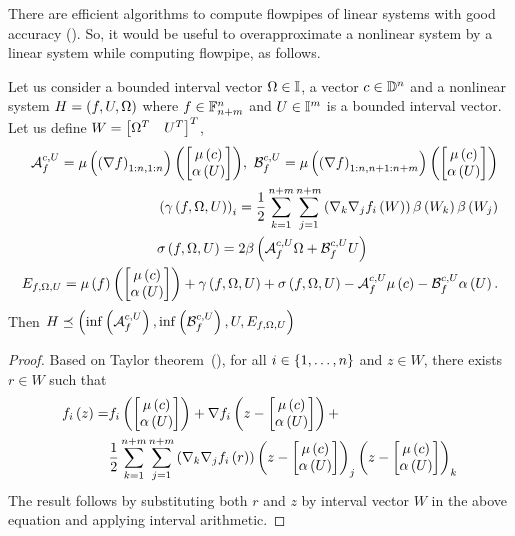 %
There are efficient algorithms to compute flowpipes of linear systems
with good accuracy ().  So, it would be useful to
overapproximate a nonlinear system by a linear system while computing
flowpipe, as follows.
%
\begin{lemma}\label{lem:linearization}
Let us consider a bounded interval vector $\Omega\in\mathbb{I}$, a
vector $c\in\mathbb{D}^n$ and a nonlinear system $H = \left(f,U,\Omega\right)$
where $f\in\mathbb{F}_{n+m}^n$ and $U\in\mathbb{I}^m$ is a bounded interval
vector.  Let us define $W = \begin{bmatrix}\Omega^T & U^T\end{bmatrix}^T$,
\begin{align*}
\begin{split}
\stmat{f}{c}{U} = { \iv{\rb{\nabla{f}}_{1:n,1:n}}{ \mymatrix{ \ivmat{c}\\ \mi{U} } } },
%
~\inpmat{f}{c}{U}
= { \iv{\rb{\nabla{f}}_{1:n,n+1:n+m}}{ \mymatrix{ \ivmat{c}\\ \mi{U}}} }
\end{split}\\
%
\begin{split}
& \rb{\taylor{f}{\Omega}{U}}_i
= \frac{1}{2}\sum_{k=1}^{n+m}\sum_{j=1}^{n+m}\rb{\nabla_k\nabla_j{f_i}\rb{W}}\rad{W_k}\rad{W_j}\\
%
& \sigma\rb{f,\Omega,U} = 2\rad{ \stmat{f}{c}{U}\Omega +
\inpmat{f}{c}{U}U
}
\end{split}\\
%
\begin{split}
\err{f}{\Omega}{U} = \iv{f}{ \mymatrix{ \ivmat{c}\\ \mi{U} } }
+ \taylor{f}{\Omega}{U} + \sigma\rb{f,\Omega,U}
- \stmat{f}{c}{U}\ivmat{c} - \inpmat{f}{c}{U}\mi{U}.
\end{split}
\end{align*}
Then $
H \preceq
\left(\inf\left(\mathcal{A}_{f}^{c,U}\right),
\inf\left(\mathcal{B}_{f}^{c,U}\right),
U,
E_{f,\Omega,U}
\right) $
%
\end{lemma}
%
\begin{proof}
Based on Taylor theorem~(), for all $i\in\left\{1,\ldots,n\right\}$
and $z\in W$, there exists $r\in W$ such that
%
\begin{align*}
f_i\left(z\right) = & f_i\left(\begin{bmatrix}\mu\left(c\right) \\ \alpha\left(U\right)\end{bmatrix}\right) + \nabla
f_i\left(z-\begin{bmatrix}\mu\left(c\right) \\ \alpha\left(U\right)\end{bmatrix}\right) +\\
& \frac{1}{2}\sum_{k=1}^{n+m}\sum_{j=1}^{n+m}\left(\nabla_k\nabla_j{f_i}\left(r\right)\right)\left(z-\begin{bmatrix}\mu\left(c\right) \\ \alpha\left(U\right)\end{bmatrix}\right)_j\left(z-\begin{bmatrix}\mu\left(c\right) \\ \alpha\left(U\right)\end{bmatrix}\right)_k
\end{align*}
%
The result follows by substituting both $r$ and $z$ by interval
vector $W$ in the above equation and applying interval arithmetic.
\end{proof}

